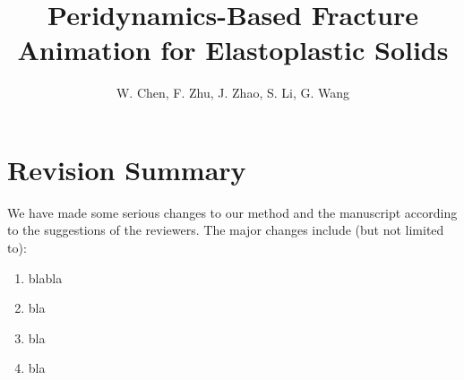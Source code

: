 

\title[Peridynamics-Based Fracture Animation for Elastoplastic Solids]%
      {Peridynamics-Based Fracture Animation for Elastoplastic Solids}

\author[W. Chen et al.]{W. Chen, F. Zhu, J. Zhao,
  S. Li, G. Wang}



%



\maketitle

\section{Revision Summary}

We have made some serious changes to our method and the manuscript according to the suggestions of the reviewers. The major changes include (but not limited to):
\begin{enumerate}
\item{blabla}
\item{bla}
\item{bla}
\item{bla}
\end{enumerate}

